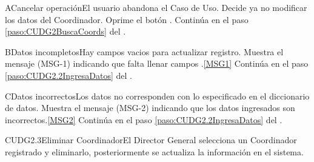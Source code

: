 	\begin{UCtrayectoriaA}{A}{Cancelar operación}{El usuario abandona el Caso de Uso.}
		\UCpaso[\UCactor] Decide ya no modificar los datos del Coordinador.
		\UCpaso[\UCactor] Oprime el botón .
		\UCpaso Continúa en el paso \ref{paso:CUDG2BuscaCoords} del .
	\end{UCtrayectoriaA}

	\begin{UCtrayectoriaA}{B}{Datos incompletos}{Hay campos vacios para actualizar registro.}
			\UCpaso Muestra el mensaje (MSG-1) indicando que falta llenar campos .\ref{MSG1} 
			\UCpaso Continúa en el paso \ref{paso:CUDG2.2IngresaDatos} del .
	\end{UCtrayectoriaA}

	\begin{UCtrayectoriaA}{C}{Datos incorrectos}{Los datos no corresponden con lo especificado en el diccionario de datos.}
			\UCpaso Muestra el mensaje (MSG-2) indicando que los datos ingresados son incorrectos.\ref{MSG2}
			\UCpaso Continúa en el paso \ref{paso:CUDG2.2IngresaDatos} del .
	\end{UCtrayectoriaA}

	\begin{UseCase}{CUDG2.3}{Eliminar Coordinador}{El Director General selecciona  un Coordinador registrado y eliminarlo, posteriormente se actualiza la información en el sistema.}
	\end{UseCase}

